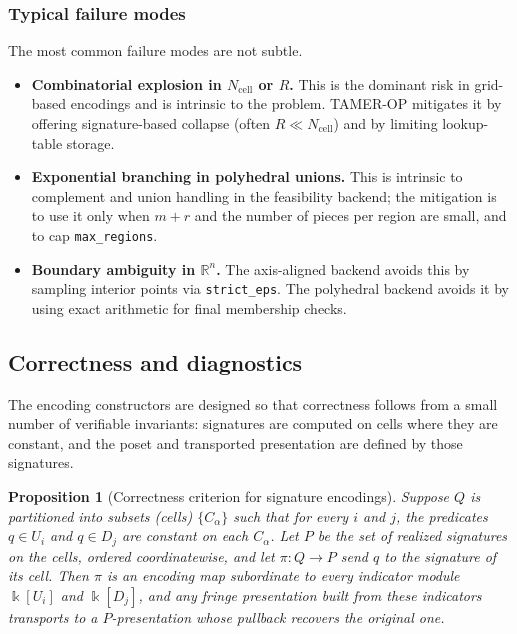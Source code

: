 \documentclass{article}
\newcommand{\kk}{\Bbbk}
\newcommand{\<}{\langle}
\renewcommand{\>}{\rangle}
\newtheorem*{proposition}{Proposition}
\theoremstyle{definition}
\theoremstyle{remark}
\begin{document}
	\subsubsection*{Typical failure modes}
	
	The most common failure modes are not subtle.
	\begin{itemize}
		\item \textbf{Combinatorial explosion in $N_{\mathrm{cell}}$ or $R$.}
		This is the dominant risk in grid-based encodings and is intrinsic to the problem.
		TAMER-OP mitigates it by offering signature-based collapse (often $R\ll N_{\mathrm{cell}}$)
		and by limiting lookup-table storage.
		\item \textbf{Exponential branching in polyhedral unions.}
		This is intrinsic to complement and union handling in the feasibility backend; the
		mitigation is to use it only when $m+r$ and the number of pieces per region are small,
		and to cap \texttt{max\_regions}.
		\item \textbf{Boundary ambiguity in $\mathbb{R}^n$.}
		The axis-aligned backend avoids this by sampling interior points via \texttt{strict\_eps}.
		The polyhedral backend avoids it by using exact arithmetic for final membership checks.
	\end{itemize}
	
	\subsection{Correctness and diagnostics}
	\label{subsec:encoding-correctness}
	
	The encoding constructors are designed so that correctness follows from a small number
	of verifiable invariants: signatures are computed on cells where they are constant, and
	the poset and transported presentation are defined by those signatures.
	
	\begin{proposition}[Correctness criterion for signature encodings]
		\label{prop:encoding-correctness}
		Suppose $Q$ is partitioned into subsets (cells) $\{C_\alpha\}$ such that for every $i$
		and $j$, the predicates $q\in U_i$ and $q\in D_j$ are constant on each $C_\alpha$.
		Let $P$ be the set of realized signatures on the cells, ordered coordinatewise, and let
		$\pi\colon Q\to P$ send $q$ to the signature of its cell.
		Then $\pi$ is an encoding map subordinate to every indicator module $\kk[U_i]$ and
		$\kk[D_j]$, and any fringe presentation built from these indicators transports to a
		$P$-presentation whose pullback recovers the original one.
	\end{proposition}
	
\end{document}
